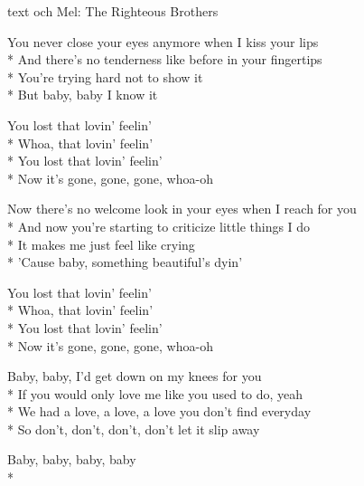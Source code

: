\begin{SongText}
    \begin{SongInfo}
        text och Mel: The Righteous Brothers
    \end{SongInfo}
    \begin{SongVerse}
        You never close your eyes anymore when I kiss your lips\\*%
        And there's no tenderness like before in your fingertips\\*%
        You're trying hard not to show it\\*%
        But baby, baby I know it
    \end{SongVerse}
    \begin{SongVerse}
        You lost that lovin' feelin'\\*%
        Whoa, that lovin' feelin'\\*%
        You lost that lovin' feelin'\\*%
        Now it's gone, gone, gone, whoa-oh
    \end{SongVerse}
    \begin{SongVerse}
        Now there's no welcome look in your eyes when I reach for you\\*%
        And now you're starting to criticize little things I do\\*%
        It makes me just feel like crying\\*%
        'Cause baby, something beautiful's dyin'
    \end{SongVerse}
    \begin{SongVerse}
        You lost that lovin' feelin'\\*%
        Whoa, that lovin' feelin'\\*%
        You lost that lovin' feelin'\\*%
        Now it's gone, gone, gone, whoa-oh
    \end{SongVerse}
    \begin{SongVerse}
        Baby, baby, I'd get down on my knees for you\\*%
        If you would only love me like you used to do, yeah\\*%
        We had a love, a love, a love you don't find everyday\\*%
        So don't, don't, don't, don't let it slip away
    \end{SongVerse}
    \begin{SongVerse}
        Baby, baby, baby, baby\\*%

\end{SongVerse}
\end{SongText}
